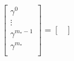\begin{equation}
    \begin{bmatrix}
        \gamma^0     \\
        \vdots       \\
        \gamma^{m_* - 1} \\
        \gamma^{m_*} \\
    \end{bmatrix} 
    = 
    \begin{bmatrix}

\end{bmatrix}
\end{equation}
